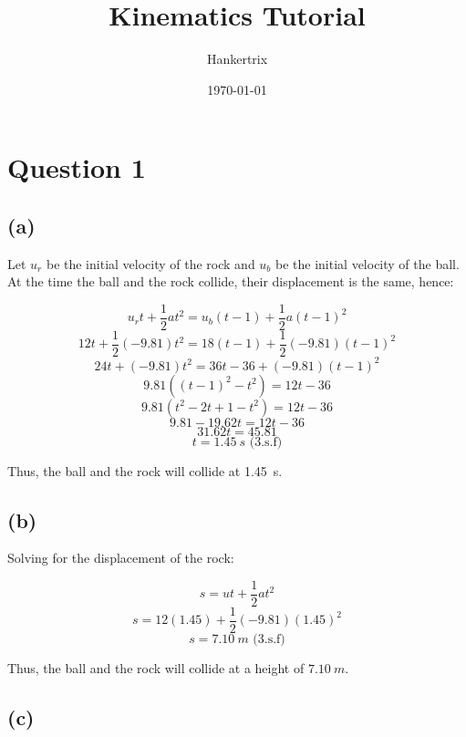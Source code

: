 \documentclass[11pt]{article}
\author{Hankertrix}
\date{\today}
\title{Kinematics Tutorial}
\begin{document}
\maketitle
\setcounter{tocdepth}{2}
\tableofcontents

\newpage

\section{Question 1}
\label{sec:orgd2447eb}

\subsection{(a)}
\label{sec:org349bb8f}

Let \(u_r\) be the initial velocity of the rock and \(u_b\) be the initial velocity of the ball.
\\[0pt]

At the time the ball and the rock collide, their displacement is the same, hence:

\[u_rt + \frac{1}{2}at^2 = u_b(t - 1) + \frac{1}{2}a(t - 1)^2\]
\[12t + \frac{1}{2}(-9.81)t^2 = 18(t - 1) + \frac{1}{2}(-9.81)(t - 1)^2\]
\[24t + (-9.81)t^2 = 36t - 36 + (-9.81)(t - 1)^2\]
\[9.81((t - 1)^2 - t^2) = 12t - 36\]
\[9.81(t^2 - 2t + 1 - t^2) = 12t - 36\]
\[9.81 - 19.62t = 12t - 36\]
\[31.62t = 45.81\]
\[t = \qty{1.45}{s} \text{ (3.s.f)}\]

\begin{center}
Thus, the ball and the rock will collide at \qty{1.45}{s}.
\end{center}


\subsection{(b)}
\label{sec:org3ad183e}

Solving for the displacement of the rock:

\[s = ut + \frac{1}{2}at^2\]
\[s = 12(1.45) + \frac{1}{2}(-9.81)(1.45)^2\]
\[s = \qty{7.10}{m} \text{ (3.s.f)}\]

\begin{center}
Thus, the ball and the rock will collide at a height of $\qty{7.10}{m}$.
\end{center}


\subsection{(c)}
\label{sec:orgd2069ec}
\end{document}
